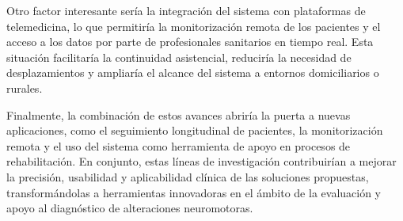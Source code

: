 Otro factor interesante sería la integración del sistema con plataformas de telemedicina, lo que permitiría la monitorización remota de los pacientes y el acceso a los datos por parte de profesionales sanitarios en tiempo real. Esta situación facilitaría la continuidad asistencial, reduciría la necesidad de desplazamientos y ampliaría el alcance del sistema a entornos domiciliarios o rurales.

Finalmente, la combinación de estos avances abriría la puerta a nuevas aplicaciones, como el seguimiento longitudinal de pacientes, la monitorización remota y el uso del sistema como herramienta de apoyo en procesos de rehabilitación. En conjunto, estas líneas de investigación contribuirían a mejorar la precisión, usabilidad y aplicabilidad clínica de las soluciones propuestas, transformándolas a herramientas innovadoras en el ámbito de la evaluación y apoyo al diagnóstico de alteraciones neuromotoras.